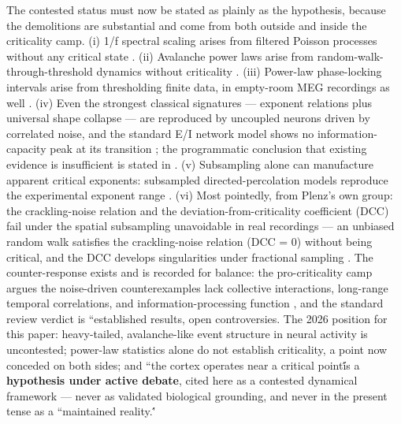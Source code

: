 \documentclass[11pt,twocolumn]{article}
\theoremstyle{plain}
\begin{document}
The contested status must now be stated as plainly as the hypothesis, because the demolitions are substantial and come from both outside and inside the criticality camp. (i) 1/f spectral scaling arises from filtered Poisson processes without any critical state \citep{bedard2006}. (ii) Avalanche power laws arise from random-walk-through-threshold dynamics without criticality \citep{touboul2010}. (iii) Power-law phase-locking intervals arise from thresholding finite data, in empty-room MEG recordings as well \citep{botcharova2012}. (iv) Even the strongest classical signatures — exponent relations plus universal shape collapse — are reproduced by uncoupled neurons driven by correlated noise, and the standard E/I network model shows no information-capacity peak at its transition \citep{touboul2017}; the programmatic conclusion that existing evidence is insufficient is stated in \citet{destexhe2021}. (v) Subsampling alone can manufacture apparent critical exponents: subsampled directed-percolation models reproduce the experimental exponent range \citep{carvalho2021}. (vi) Most pointedly, from Plenz's own group: the crackling-noise relation and the deviation-from-criticality coefficient (DCC) fail under the spatial subsampling unavoidable in real recordings — an unbiased random walk satisfies the crackling-noise relation (DCC = 0) without being critical, and the DCC develops singularities under fractional sampling \citep{srinivasan2024}. The counter-response exists and is recorded for balance: the pro-criticality camp argues the noise-driven counterexamples lack collective interactions, long-range temporal correlations, and information-processing function \citep{beggs2022}, and the standard review verdict is ``established results, open controversies\'\' \citep{wilting2019}. The 2026 position for this paper: heavy-tailed, avalanche-like event structure in neural activity is uncontested; power-law statistics alone do not establish criticality, a point now conceded on both sides; and ``the cortex operates near a critical point\'\' is a \textbf{hypothesis under active debate}, cited here as a contested dynamical framework — never as validated biological grounding, and never in the present tense as a ``maintained reality.\'\'
\end{document}
